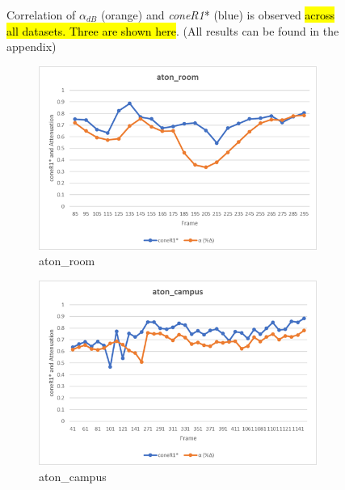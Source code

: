 \begin{figure}
\caption{Correlation of $\alpha_{dB}$ (orange) and \textit{coneR1}* (blue) is observed \hl{across all datasets. Three are shown here}. (All results can be found in the appendix)}
\label{fig:corr_db}
\end{figure}

\begin{figure}
  \centering
  \begin{subfigure}{1\linewidth}
  \includegraphics[width=1\linewidth]{figures/room_rgb_corr.jpg}
  \caption{aton\_room}
\end{subfigure}
\hfill
\begin{subfigure}{.49\linewidth}
  \includegraphics[width=1\linewidth]{figures/campus_rgb_corr.jpg}
  \caption{aton\_campus}
\end{subfigure}
\begin{subfigure}{.49\linewidth}

\end{subfigure}
\end{figure}
